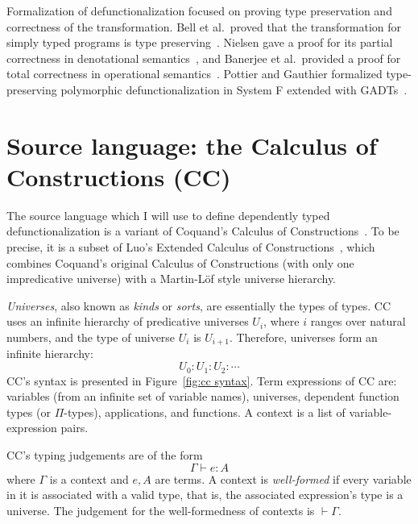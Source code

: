 
Formalization of defunctionalization focused on proving type preservation and correctness of the transformation. Bell et al.~proved that the transformation for simply typed programs is type preserving~\cite{DBLP:conf/icfp/BellBH97}.  Nielsen gave a proof for its partial correctness in denotational semantics~\cite{nielsen2000denotational}, and Banerjee et al.~provided a proof for total correctness in operational semantics~\cite{DBLP:conf/tacs/BanerjeeHR01}. Pottier and Gauthier formalized type-preserving polymorphic defunctionalization in System F extended with GADTs~\cite{DBLP:conf/popl/PottierG04}.

\section{Source language: the Calculus of\\ Constructions (CC)}
\label{sec: 2.2}

The source language which I will use to define dependently typed defunctionalization is a variant of Coquand’s Calculus of Constructions~\cite{DBLP:journals/iandc/CoquandH88}. To be precise, it is a subset of Luo's Extended Calculus of Constructions~\cite{DBLP:phd/ethos/Luo90}, which combines Coquand's original Calculus of Constructions (with only one impredicative universe) with a Martin-Löf style universe hierarchy. 

\textit{Universes}, also known as \textit{kinds} or \textit{sorts}, are essentially the types of types. CC uses an infinite hierarchy of predicative universes $U_i$, where $i$ ranges over natural numbers, and the type of universe $U_i$ is $U_{i+1}$. Therefore, universes form an infinite hierarchy:
\begin{equation*}
U_0 : U_1 : U_2 : \cdots
\end{equation*}
CC's syntax is presented in Figure~\ref{fig:cc syntax}. Term expressions of CC are: variables (from an infinite set of variable names), universes, dependent function types (or $\Pi$-types), applications, and functions. A context is a list of variable-expression pairs.

CC's typing judgements are of the form
\begin{equation*}
	\Gamma \vdash e : A
\end{equation*}
where $\Gamma$ is a context and $e, A$ are terms. A context is \textit{well-formed} if every variable in it is associated with a valid type, that is, the associated expression’s type is a universe. The judgement for the well-formedness of contexts is $\vdash \Gamma$. 

